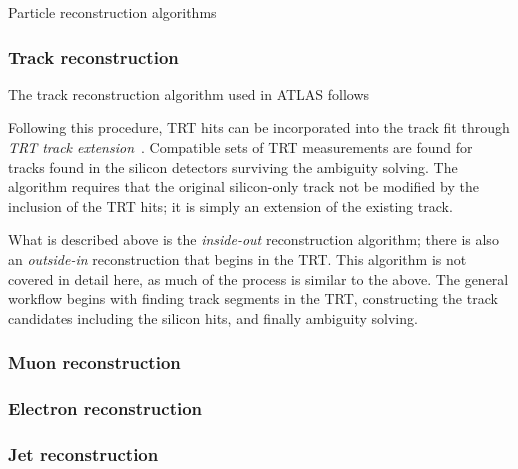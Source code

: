 Particle reconstruction algorithms

\subsubsection{Track reconstruction}\label{detector:track_reconstruction}
The track reconstruction algorithm used in ATLAS follows 

Following this procedure, TRT hits can be incorporated into the track fit through \emph{TRT track extension}~\cite{2008.newt}.
Compatible sets of TRT measurements are found for tracks found in the silicon detectors surviving the ambiguity solving.
The algorithm requires that the original silicon-only track not be modified by the inclusion of the TRT hits; it is simply an extension of the existing track.

What is described above is the \emph{inside-out} reconstruction algorithm; there is also an \emph{outside-in} reconstruction that begins in the TRT.
This algorithm is not covered in detail here, as much of the process is similar to the above.
The general workflow begins with finding track segments in the TRT, constructing the track candidates including the silicon hits, and finally ambiguity solving.

\subsubsection{Muon reconstruction}\label{detector:muon_reconstruction}

\subsubsection{Electron reconstruction}\label{detector:electron_reconstruction}

\subsubsection{Jet reconstruction}\label{detector:jet_reconstruction}
